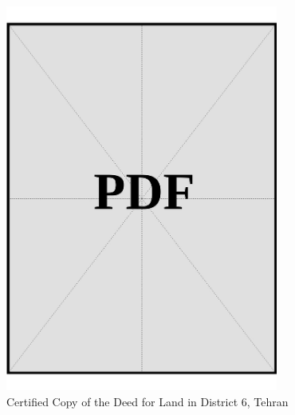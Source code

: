 \vspace*{\fill}
\begin{figure}[h]
    \centering
    \includegraphics[page=1, width=0.8\textwidth]{../docs/applicant/funds/property-deeds/property-1/certified-copies.pdf}
    \caption{Certified Copy of the Deed for Land in District 6, Tehran}
    \label{fig:applicant-land-dist6-tehran-certified-copy}
\end{figure}
\vspace*{\fill}

\clearpage